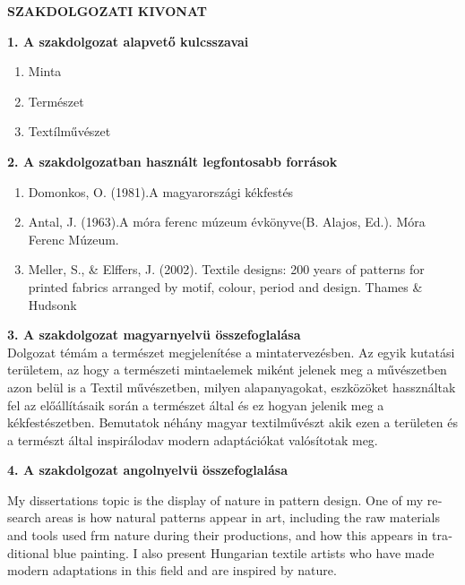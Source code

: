 \thispagestyle{plain}
\begin{center}
    \Large
    \textbf{SZAKDOLGOZATI KIVONAT}
\end{center}
\textbf{1. A szakdolgozat alapvető kulcsszavai}
\begin{enumerate}[label=\alph*)]
	\item Minta
	\item Természet
	\item Textílművészet
\end{enumerate}
\vspace{0.5 cm}
\textbf{2. A szakdolgozatban használt legfontosabb források}
\begin{enumerate}[label=\alph*)]
	\item Domonkos, O. (1981).A magyarországi kékfestés
	\item Antal, J. (1963).A móra ferenc múzeum évkönyve(B. Alajos, Ed.). Móra Ferenc Múzeum.
	\item Meller, S., \& Elffers, J. (2002). Textile designs: 200 years of patterns for printed fabrics arranged by motif, colour, period and design. Thames \& Hudsonk
\end{enumerate}
\vspace{0.5 cm}

\textbf{3. A szakdolgozat magyarnyelvü összefoglalása}
\vspace{0.2 cm}
\\
Dolgozat témám a természet megjelenítése a mintatervezésben.
Az egyik kutatási területem, az hogy a természeti mintaelemek miként jelenek meg a művészetben azon belül is a Textil művészetben, milyen alapanyagokat, eszközöket  hassználtak fel az előállításaik során a természet által és ez hogyan jelenik meg a kékfestészetben.
Bemutatok néhány magyar textilművészt akik ezen a területen és a természt által inspirálodav modern adaptációkat valósítotak meg.
\vspace{0.5 cm}

\textbf{4. A szakdolgozat angolnyelvü összefoglalása}
\vspace{0.2 cm}
\\
\begin{otherlanguage}{english}
My dissertations topic is the display of nature in pattern design.
One of my research areas is how natural patterns  appear in art, including the raw materials and tools used frm nature during their productions, and how this appears in traditional blue painting.
I also present Hungarian textile artists who have made modern adaptations in this field and are inspired by nature. 
\end{otherlanguage}
\newpage